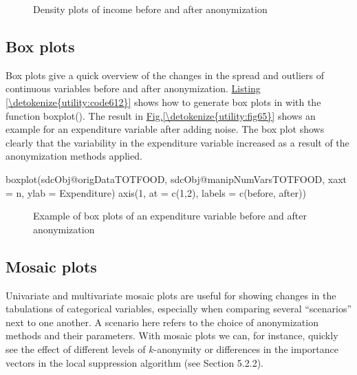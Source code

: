 \documentclass[letterpaper,10pt,english]{sphinxmanual}
\begin{document}
\begin{figure}[htbp]
\centering
\capstart

\noindent{}
\caption{Density plots of income before and after anonymization}\label{\detokenize{utility:fig64}}\label{\detokenize{utility:id6}}\end{figure}


\subsection{Box plots}
\label{\detokenize{utility:box-plots}}
Box plots give a quick overview of the changes in the spread and
outliers of continuous variables before and after anonymization. \hyperref[\detokenize{utility:code612}]{Listing \ref{\detokenize{utility:code612}}}
shows how to generate box plots in  with the function boxplot().
The result in \hyperref[\detokenize{utility:fig65}]{Fig.\@ \ref{\detokenize{utility:fig65}}} shows an example for an expenditure variable
after adding noise. The box plot shows clearly that the variability in
the expenditure variable increased as a result of the anonymization
methods applied.

\def\sphinxLiteralBlockLabel{\label{\detokenize{utility:code612}}}
%
\begin{sphinxVerbatim}[commandchars=\\\{\},numbers=left,firstnumber=1,stepnumber=1]
boxplot(sdcObj@origData\PYGZdl{}TOTFOOD, sdcObj@manipNumVars\PYGZdl{}TOTFOOD, xaxt = \PYGZsq{}n\PYGZsq{}, ylab = \PYGZdq{}Expenditure\PYGZdq{})
axis(1, at = c(1,2), labels = c(\PYGZsq{}before, \PYGZsq{}after\PYGZsq{}))
\end{sphinxVerbatim}

\begin{figure}[htbp]
\centering
\capstart

\noindent{}
\caption{Example of box plots of an expenditure variable before and after anonymization}\label{\detokenize{utility:fig65}}\label{\detokenize{utility:id7}}\end{figure}


\subsection{Mosaic plots}
\label{\detokenize{utility:mosaic-plots}}
Univariate and multivariate mosaic plots are useful for showing changes
in the tabulations of categorical variables, especially when comparing
several “scenarios” next to one another. A scenario here refers to the
choice of anonymization methods and their parameters. With mosaic plots
we can, for instance, quickly see the effect of different levels of
\(k\)-anonymity or differences in the importance vectors in the
local suppression algorithm (see Section 5.2.2).
\end{document}
